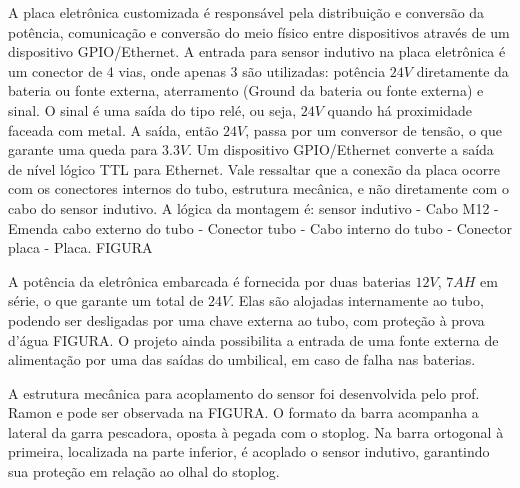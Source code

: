 A placa eletrônica customizada é responsável pela distribuição e conversão da
potência, comunicação e conversão do meio físico entre dispositivos através de
um dispositivo GPIO/Ethernet. A entrada para sensor indutivo na placa eletrônica
é um conector de 4 vias, onde apenas 3 são utilizadas: potência $24V$
diretamente da bateria ou fonte externa, aterramento (Ground da bateria ou fonte
externa) e sinal. O sinal é uma saída do tipo relé, ou seja, $24V$ quando há
proximidade faceada com metal. A saída, então $24V$, passa por um conversor de
tensão, o que garante uma queda para $3.3V$. Um dispositivo GPIO/Ethernet
converte a saída de nível lógico TTL para Ethernet. Vale ressaltar que a
conexão da placa ocorre com os conectores internos do tubo, estrutura mecânica, e não diretamente com o cabo do sensor indutivo. A lógica da montagem é: sensor indutivo - Cabo
M12 - Emenda cabo externo do tubo - Conector tubo - Cabo interno do tubo -
Conector placa - Placa. FIGURA

A potência da eletrônica embarcada é fornecida por duas baterias $12V$, $7AH$ em
série, o que garante um total de $24V$. Elas são alojadas internamente ao tubo,
podendo ser desligadas por uma chave externa ao tubo, com proteção à prova
d'água FIGURA. O projeto ainda possibilita a entrada de uma fonte externa de
alimentação por uma das saídas do umbilical, em caso de falha nas baterias.

A estrutura mecânica para acoplamento do sensor foi desenvolvida pelo prof.
Ramon e pode ser observada na FIGURA. O formato da barra acompanha a lateral
da garra pescadora, oposta à pegada com o stoplog. Na barra ortogonal à
primeira, localizada na parte inferior, é acoplado o sensor indutivo, garantindo
sua proteção em relação ao olhal do stoplog. 




\label{materials}




